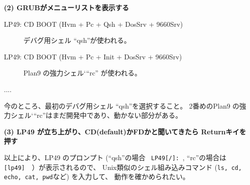 {\bf (2) GRUBがメニューリストを表示する}
   \begin{description}
   \item[LP49: CD BOOT (Hvm + Pc + Qsh + DosSrv + 9660Srv)]  デバグ用シェル ``qsh''が使われる。
   \item[LP49: CD BOOT (Hvm + Pc + Init + DosSrv + 9660Srv)] Plan9 の強力シェル‘``rc'' が使われる。
   \item[....]
   \end{description}
    今のところ、最初のデバグ用シェル ``qsh''を選択すること。
    2番めのPlan9 の強力シェル‘``rc''はまだ開発中であり、動かない部分がある。

{\bf (3)  LP49 が立ち上がり、CD(default)かFDかと聞いてきたら Returnキイを押す}

         以上により、LP49 のプロンプト 
         (``qsh''の場合 \verb| LP49[/]: |, ``rc''の場合は \verb| [lp49]  |）が表示されるので、
         Unix類似のシェル組み込みコマンド ({\tt ls, cd, echo, cat, pwd}など) を入力して、
         動作を確かめられたい。




\begin{comment}
\section{フロッピーからブートする場合}
\begin{enumerate}
\item フロッピーから起動する。
  \begin{itemize}
  \item  実機の場合\\
          フロッピーイメージファイル lp49-boot.fd をフロッピーに書き込み、フロッビーからブートする。
  \item  QEMU の場合\\
          フロッピーイメージファイル lp49-boot.fd を用いて qemuを起動する。
          qemuは 2.8MBフロッピーが使える。\\
            \verb|# qemu -fda  lp49-boot-x2.fd -std-vga|  

  \item   VMware の場合\\
          フロッピーイメージファイル lp49-boot.fd  を用いて VMwareを起動する。
  \end{itemize}

\item メニューが表示されたら LP49: FD BOOT (....) を選択する。
\item     LP49 が立ち上がり、CDかFDかと聞いてきたら f と打ちReturnキイを押す。
\end{enumerate}
\end{comment}


